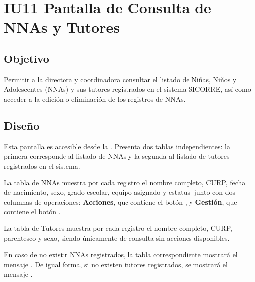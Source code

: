 \section{IU11 Pantalla de Consulta de NNAs y Tutores}

\subsection{Objetivo}
Permitir a la directora y coordinadora consultar el listado de Niñas, Niños y Adolescentes (NNAs) y sus tutores registrados en el sistema SICORRE, así como acceder a la edición o eliminación de los registros de NNAs.

\subsection{Diseño}
Esta pantalla  es accesible desde la . Presenta dos tablas independientes: la primera corresponde al listado de NNAs y la segunda al listado de tutores registrados en el sistema.

La tabla de NNAs muestra por cada registro el nombre completo, CURP, fecha de nacimiento, sexo, grado escolar, equipo asignado y estatus, junto con dos columnas de operaciones: \textbf{Acciones}, que contiene el botón , y \textbf{Gestión}, que contiene el botón .

La tabla de Tutores muestra por cada registro el nombre completo, CURP, parentesco y sexo, siendo únicamente de consulta sin acciones disponibles.

En caso de no existir NNAs registrados, la tabla correspondiente mostrará el mensaje . De igual forma, si no existen tutores registrados, se mostrará el mensaje .


